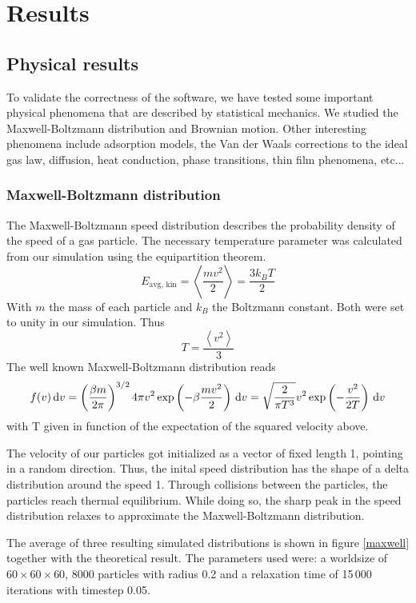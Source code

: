 \section{Results}
\subsection{Physical results}

To validate the correctness of the software, we have tested some important 
physical phenomena that are described by statistical mechanics. We studied the 
Maxwell-Boltzmann distribution and Brownian motion. Other interesting phenomena 
include adsorption models, the Van der Waals corrections to the ideal gas law, 
diffusion, heat conduction, phase transitions, thin film phenomena, etc...

\subsubsection{Maxwell-Boltzmann distribution}
The Maxwell-Boltzmann speed distribution describes the probability density of 
the speed of a gas particle. The necessary temperature parameter was calculated 
from our simulation using the equipartition theorem.
$$
E_{\textrm{avg, kin}} = \left< \frac{mv^2}{2} \right> = \frac{3k_BT}{2}
$$
With $m$ the mass of each particle and $k_B$ the Boltzmann constant. Both were 
set to unity in our simulation. Thus
$$
T = \frac{\left< v^2 \right>}{3}
$$
The well known Maxwell-Boltzmann distribution reads \cite{maxwellDist}
$$
f(v)\,\mathrm d v = \left( \frac{\beta m}{2 \pi} \right)^{3/2} 4 \pi v^2
\exp\left( -\beta \frac{mv^2}{2}\right) \,\mathrm d v =
\sqrt{ \frac{2}{\pi T^3} } v^2 \exp \left(-\frac{v^2}{2T}\right) \,\mathrm d v
$$
with T given in function of the expectation of the squared velocity above.

The velocity of our particles got initialized as a vector of fixed length 
1, pointing in a random direction. Thus, the inital speed distribution has 
the shape of a delta distribution around the speed 1. Through collisions 
between the particles, the particles reach thermal equilibrium. While doing 
so, the sharp peak in the speed distribution relaxes to approximate the 
Maxwell-Boltzmann distribution.


The average of three  resulting simulated distributions is shown in figure 
\ref{maxwell} together with the theoretical result. The parameters used 
were: a worldsize of $60 \times 60 \times 60$, 8000 particles with radius 
0.2 and a relaxation time of 15\,000 iterations with timestep 0.05.


